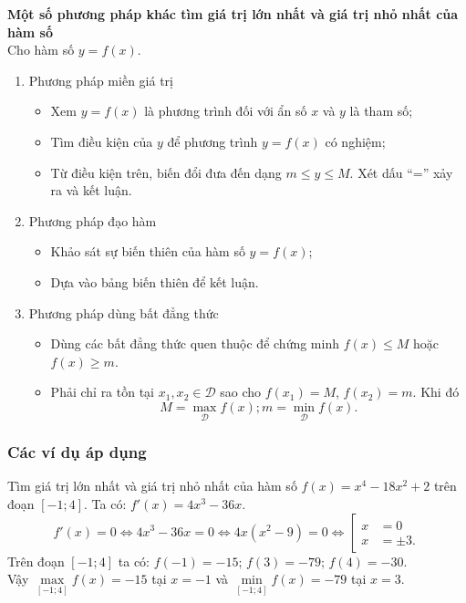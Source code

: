 \textbf{Một số phương pháp khác tìm giá trị lớn nhất và giá trị nhỏ nhất của hàm số}\\
Cho hàm số $y = f(x)$.
\begin{enumerate}
	\item Phương pháp miền giá trị
	\begin{itemize}
		\item Xem $y = f(x)$ là phương trình đối với ẩn số $x$ và $y$ là tham số;
		\item Tìm điều kiện của $y$ để phương trình $y = f(x)$ có nghiệm;
		\item Từ điều kiện trên, biến đổi đưa đến dạng $m \leq y \leq M$. Xét dấu ``='' xảy ra và kết luận.
	\end{itemize}
	\item Phương pháp đạo hàm
	\begin{itemize}
		\item Khảo sát sự biến thiên của hàm số $y = f(x)$;
		\item Dựa vào bảng biến thiên để kết luận.
	\end{itemize}
	\item Phương pháp dùng bất đẳng thức
	\begin{itemize}
		\item Dùng các bất đẳng thức quen thuộc để chứng minh $f(x) \leq M$ hoặc $f(x) \geq m$.
		\item Phải chỉ ra tồn tại $x_1, x_2 \in \mathscr{D}$ sao cho $f(x_1) = M$, $f(x_2) = m$. Khi đó
		$$M = \max\limits_{\mathscr{D}} f(x); m = \min\limits_{\mathscr{D}} f(x).$$
	\end{itemize}
\end{enumerate}
\subsubsection{Các ví dụ áp dụng}

\begin{vd}%
	Tìm giá trị lớn nhất và giá trị nhỏ nhất của hàm số $f(x) = x^4 - 18x^2 + 2$ trên đoạn $[-1;4]$.
	\loigiai
	{
		Ta có: $f'(x) = 4x^3 - 36x$.
		$$f'(x) = 0 \Leftrightarrow 4x^3 - 36x = 0 \Leftrightarrow 4x(x^2 - 9) = 0 \Leftrightarrow \left[\begin{array}{ll} x &= 0 \\ x &= \pm 3. \end{array}  \right.$$
		Trên đoạn $[-1;4]$ ta có: $f(-1) = -15; \, f(3) = -79; \, f(4) = -30$.\\
		Vậy $\max\limits_{[-1;4]} f(x) = -15$ tại $x = -1$ và $\min\limits_{[-1;4]} f(x) = -79$ tại $x = 3$.
	}
\end{vd}



